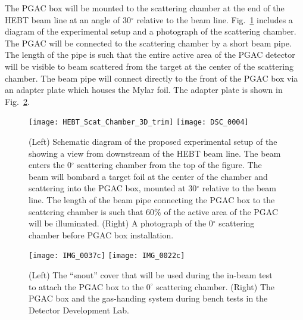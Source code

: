 The PGAC box will be mounted to the scattering chamber at the end of the HEBT beam line at an angle of 30$^\circ$ relative to the beam line.  Fig.~\ref{schematic} includes a diagram of the experimental setup and a photograph of the scattering chamber.  The PGAC will be connected to the scattering chamber by a short beam pipe.  The length of the pipe is such that the 
entire active area of the PGAC detector will be visible to beam scattered from the target
 at the center of the scattering chamber. The beam pipe will connect directly to the front of the PGAC box via an adapter plate which houses the Mylar foil. The adapter plate is shown in Fig.~\ref{photos}.

\begin{figure}[ht]
\centering
\texttt{[image: HEBT\_Scat\_Chamber\_3D\_trim]}\hspace{\fill}
\texttt{[image: DSC\_0004]} \hspace{\fill}
\caption{(Left) Schematic diagram of the proposed experimental setup of the 
showing a view from downstream of the HEBT beam line.  The beam enters the 0$^\circ$ scattering chamber from the top of the figure.  The beam will bombard a target foil at the center of the chamber and scattering into the PGAC box, mounted at 30$^\circ$ relative to the beam line.  The length of the beam pipe connecting the PGAC box to the scattering chamber is such that 60\% of the active area of the PGAC will be illuminated.  (Right) A photograph of the 0$^\circ$ scattering chamber before PGAC box installation.
}
\label{schematic}
\end{figure}
\begin{figure}[ht]%
\centering
\hspace{\fill}
\texttt{[image: IMG\_0037c]} \hspace{\fill}
\texttt{[image: IMG\_0022c]} \hspace{\fill}
\caption{(Left) The ``snout'' cover that will be used during the in-beam test to attach the PGAC box to the $0^\circ$ scattering chamber. (Right) The PGAC box and the gas-handing system during bench tests in the Detector Development Lab.}%
\label{photos}%
\end{figure}

